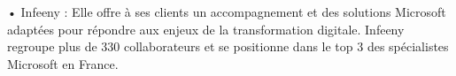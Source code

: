 •   Infeeny : Elle offre à ses clients un accompagnement et des solutions Microsoft
adaptées pour répondre aux enjeux de la transformation digitale. Infeeny regroupe plus de 330 collaborateurs et se positionne dans le top 3 des spécialistes Microsoft en France.



